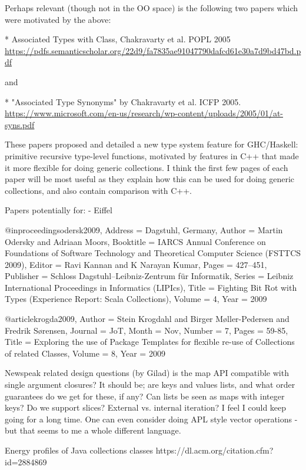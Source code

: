 \documentclass[sigconf, 10pt, review]{acmart}
\begin{document}
\begin{note}
Perhaps relevant (though not in the OO space) is the following two papers which were motivated by the above:

* Associated Types with Class, Chakravarty et al. POPL 2005
\url{https://pdfs.semanticscholar.org/22d9/fa7835ae91047790dafcd61e30a7d9bd47bd.pdf}

and

* "Associated Type Synonyms" by Chakravarty et al. ICFP 2005.
\url{https://www.microsoft.com/en-us/research/wp-content/uploads/2005/01/at-syns.pdf}

These papers proposed and detailed a new type system feature for GHC/Haskell: primitive recursive type-level functions, motivated by features in C++ that made it more flexible for doing generic collections. I think the first few pages of each paper will be most useful as they explain how this can be used for doing generic collections, and also contain comparison with C++.

Papers potentially for:
 - Eiffel

@inproceedings{odersk2009,
	Address = {Dagstuhl, Germany},
	Author = {Martin Odersky and Adriaan Moors},
	Booktitle = {IARCS Annual Conference on Foundations of Software Technology and Theoretical Computer Science (FSTTCS 2009)},
	Editor = {Ravi Kannan and K Narayan Kumar},
	Pages = {427--451},
	Publisher = {Schloss Dagstuhl--Leibniz-Zentrum {f\"{u}r} Informatik},
	Series = {Leibniz International Proceedings in Informatics (LIPIcs)},
	Title = {Fighting Bit Rot with Types (Experience Report: Scala Collections)},
	Volume = {4},
	Year = {2009}}

@article{krogda2009,
	Author = {Stein Krogdahl and Birger M{\o}ller-Pedersen and Fredrik S{\o}rensen},
	Journal = {JoT},
	Month = {Nov},
	Number = {7},
	Pages = {59-85},
	Title = {Exploring the use of Package Templates for flexible re-use of Collections of related Classes},
	Volume = {8},
	Year = {2009}}
  
  
Newspeak related design questions (by Gilad)
is the map API compatible with single argument closures? It should be; are keys and values lists, and what order guarantees do we get for these, if any? Can lists be seen as maps with integer keys? Do we support slices? External vs. internal iteration? I feel I could keep going for a long time. One can even consider doing APL style vector operations - but that seems to me a whole different language.


Energy profiles of Java collections classes
https://dl.acm.org/citation.cfm?id=2884869


\end{note}
\end{document}
